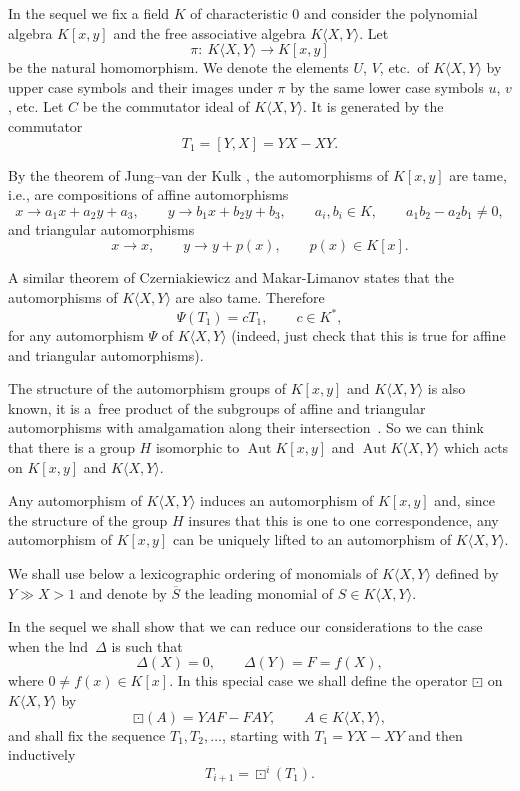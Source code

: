 \documentclass[pdftex]{sigma}
\numberwithin{equation}{section}
\begin{document}
In the sequel we fix a field $K$ of characteristic 0 and consider the polynomial algebra $K[x,y]$ and the free associative algebra $K\langle X,Y\rangle$. Let
\[
\pi\colon \ K\langle X,Y\rangle\to K[x,y]
\]
be the natural homomorphism. We denote the elements $U$, $V$, etc.\ of $K\langle X,Y\rangle$ by upper case symbols and their images under $\pi$ by the same lower case symbols $u$, $v$, etc. Let $C$ be the commutator ideal of $K\langle X,Y\rangle$. It is generated by the commutator
\[
T_1 = [Y, X] = YX - XY.
\]

By the theorem of Jung--van der Kulk \cite{J, K}, the automorphisms of $K[x,y]$ are tame, i.e., are compositions of affine automorphisms
\[
x \rightarrow a_1 x + a_2 y + a_3, \qquad y \rightarrow b_1 x + b_2 y + b_3, \qquad a_i,b_i\in K,\qquad a_1b_2 - a_2b_1 \neq 0,
\]
and triangular automorphisms
\[
x \rightarrow x, \qquad y \rightarrow y + p(x),\qquad p(x)\in K[x].
\]

A similar theorem of Czerniakiewicz \cite{Cz1, Cz2} and Makar-Limanov \cite{ML} states that the automorphisms of $K\langle X,Y\rangle$ are also tame. Therefore
\[
\Psi(T_1) = cT_1, \qquad c \in K^{\ast},
\]
for any automorphism $\Psi$ of $K\langle X,Y\rangle$ (indeed, just check that this is true for affine and triangular automorphisms).

The structure of the automorphism groups of $K[x, y]$ and $K\langle X,Y\rangle$ is also known, it is a~free product of the subgroups of affine and triangular automorphisms with amalgamation along their intersection~\cite{Se}. So we can think that there is a group $H$ isomorphic to $\operatorname{Aut}K[x,y]$ and $\operatorname{Aut}K\langle X,Y\rangle$ which acts on $K[x, y]$ and $K\langle X,Y\rangle$.

Any automorphism of $K\langle X,Y\rangle$ induces an automorphism of $K[x, y]$ and, since the structure of the group $H$ insures that this is one to one correspondence, any automorphism of $K[x,y]$ can be uniquely lifted to an automorphism of $K\langle X,Y\rangle$.

We shall use below a lexicographic ordering of monomials of $K\langle X,Y\rangle$ defined by $Y\gg X > 1$ and denote by $\overline{S}$ the leading monomial of $S \in K\langle X,Y\rangle$.

In the sequel we shall show that we can reduce our considerations to the case when the lnd~$\Delta$ is such that
\[
\Delta(X)=0,\qquad \Delta(Y)=F=f(X),
\]
where $0\not=f(x)\in K[x]$. In this special case we shall define the operator $\boxdot$ on $K\langle X,Y\rangle$ by
\[
\boxdot(A)= YAF - FAY,\qquad A\in K\langle X,Y\rangle,
\]
and shall fix the sequence $T_1,T_2,\ldots$, starting with $T_1= YX - XY$ and then inductively
\[
T_{i+1} = \boxdot^i(T_1).
\]
\end{document}
